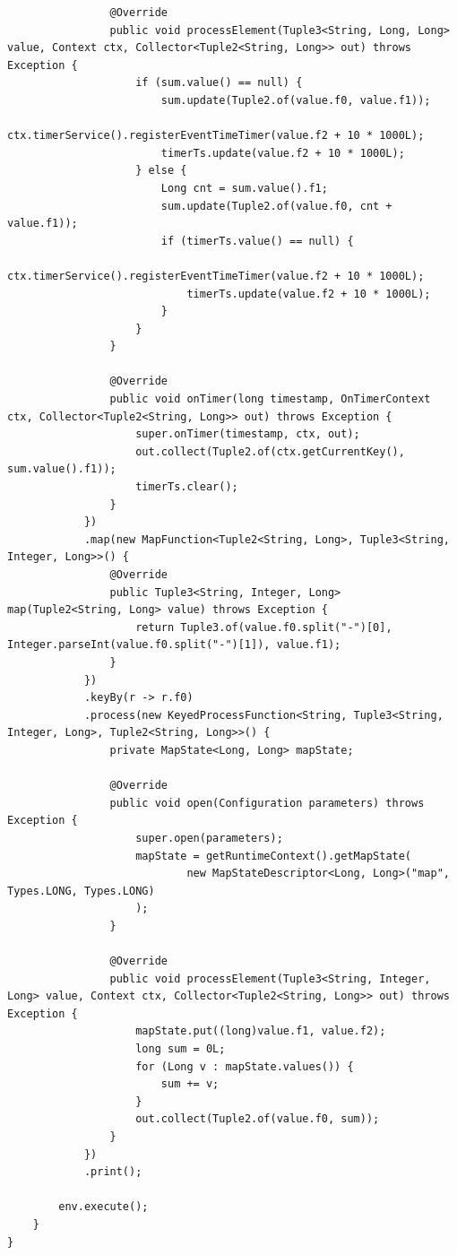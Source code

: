 \documentclass[cn,11pt,chinese]{elegantbook}
\begin{document}
\begin{verbatim}
                @Override
                public void processElement(Tuple3<String, Long, Long> value, Context ctx, Collector<Tuple2<String, Long>> out) throws Exception {
                    if (sum.value() == null) {
                        sum.update(Tuple2.of(value.f0, value.f1));
                        ctx.timerService().registerEventTimeTimer(value.f2 + 10 * 1000L);
                        timerTs.update(value.f2 + 10 * 1000L);
                    } else {
                        Long cnt = sum.value().f1;
                        sum.update(Tuple2.of(value.f0, cnt + value.f1));
                        if (timerTs.value() == null) {
                            ctx.timerService().registerEventTimeTimer(value.f2 + 10 * 1000L);
                            timerTs.update(value.f2 + 10 * 1000L);
                        }
                    }
                }

                @Override
                public void onTimer(long timestamp, OnTimerContext ctx, Collector<Tuple2<String, Long>> out) throws Exception {
                    super.onTimer(timestamp, ctx, out);
                    out.collect(Tuple2.of(ctx.getCurrentKey(), sum.value().f1));
                    timerTs.clear();
                }
            })
            .map(new MapFunction<Tuple2<String, Long>, Tuple3<String, Integer, Long>>() {
                @Override
                public Tuple3<String, Integer, Long> map(Tuple2<String, Long> value) throws Exception {
                    return Tuple3.of(value.f0.split("-")[0], Integer.parseInt(value.f0.split("-")[1]), value.f1);
                }
            })
            .keyBy(r -> r.f0)
            .process(new KeyedProcessFunction<String, Tuple3<String, Integer, Long>, Tuple2<String, Long>>() {
                private MapState<Long, Long> mapState;

                @Override
                public void open(Configuration parameters) throws Exception {
                    super.open(parameters);
                    mapState = getRuntimeContext().getMapState(
                            new MapStateDescriptor<Long, Long>("map", Types.LONG, Types.LONG)
                    );
                }

                @Override
                public void processElement(Tuple3<String, Integer, Long> value, Context ctx, Collector<Tuple2<String, Long>> out) throws Exception {
                    mapState.put((long)value.f1, value.f2);
                    long sum = 0L;
                    for (Long v : mapState.values()) {
                        sum += v;
                    }
                    out.collect(Tuple2.of(value.f0, sum));
                }
            })
            .print();

        env.execute();
    }
}

\end{verbatim}
\end{document}
